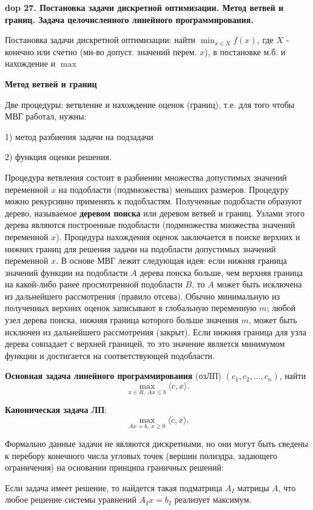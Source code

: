 \textbf{\LARGE dop 27. Постановка задачи дискретной оптимизации. Метод ветвей и границ. Задача целочисленного линейного программирования.}

Постановка задачи дискретной оптимизации: найти $\min_{x \in X} f(x)$, где $X$ - конечно или счетно (мн-во допуст. значений перем. $x$), в постановке м.б. и нахождение и $\max$

\textbf{Метод ветвей и границ}

Две процедуры: ветвление и нахождение оценок (границ), т.е. для того чтобы МВГ работал, нужны: 

1) метод разбиения задачи на подзадачи 

2) функция оценки решения.

Процедура ветвления состоит в разбиении множества допустимых значений переменной $x$ на подобласти (подмножества) меньших размеров. 
Процедуру можно рекурсивно применять к подобластям. 
Полученные подобласти образуют дерево, называемое \textbf{деревом поиска} или деревом ветвей и границ. Узлами этого дерева являются построенные подобласти (подмножества множества значений переменной $x$). 
Процедура нахождения оценок заключается в поиске верхних и нижних границ для решения задачи на подобласти допустимых значений переменной $x$. В основе МВГ лежит следующая идея: если нижняя граница значений функции на подобласти $A$ дерева поиска больше, чем верхняя граница на какой-либо ранее просмотренной подобласти $B$, то $A$ может быть исключена из дальнейшего рассмотрения (правило отсева). 
Обычно минимальную из полученных верхних оценок записывают в глобальную переменную $m$; любой узел дерева поиска, нижняя граница которого больше значения $m$, может быть исключен из дальнейшего рассмотрения (закрыт). 
Если нижняя граница для узла дерева совпадает с верхней границей, то это значение является минимумом функции и достигается на соответствующей подобласти.

\textbf{Основная задача линейного программирования} (озЛП) $(c_1, c_2, \dots , c_n)$, найти 
$$\max_{x \in R,~Ax \leqslant b} \langle c, x \rangle.$$

\textbf{Каноническая задача ЛП}: 
$$\max_{Ax = b,~x \geqslant 0} \langle c, x \rangle.$$

Формально данные задачи не являются дискретными, но они могут быть сведены к перебору конечного числа угловых точек (вершин полиэдра, задающего ограничения) на основании принципа граничных решений:

Если задача имеет решение, то найдется такая подматрица $A_I$ матрицы $A$, что любое решение системы уравнений $A_Ix = b_I$ реализует максимум.

